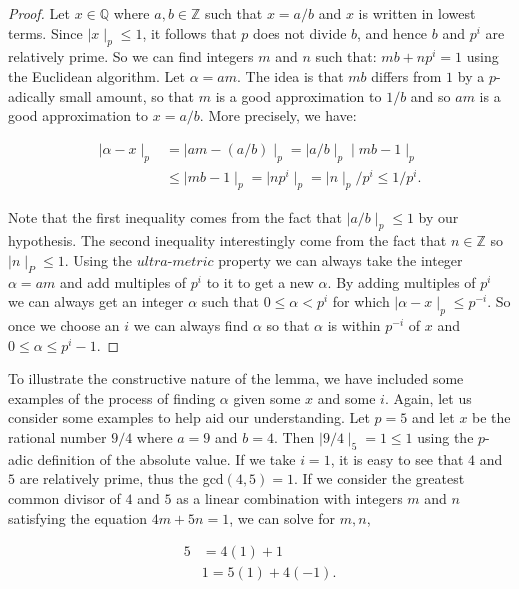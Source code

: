 \documentclass[12pt]{amsart}
\theoremstyle{plain}
\theoremstyle{definition}
\begin{document}
\begin{proof}

Let $x \in \mathbb{Q}$ where $a, b \in \mathbb{Z}$ such that $x = a/b$ and $x$ is written in lowest terms. Since $\mid x \mid_p \le 1$, it follows that $p$ does not divide $b$, and hence $b$ and $p^i$ are relatively prime. So we can find integers $m$ and $n$ such that: $mb + np^i = 1$ using the Euclidean algorithm.  Let $\alpha = am$. The idea is that $mb$ differs from $1$ by a $p$-adically small amount, so that $m$ is a good approximation to $1/b$ and so $am$ is a good approximation to $x = a/b$. More precisely, we have:


\begin{align}
\mid \alpha - x \mid_p & = \mid am - (a/b) \mid_p = \mid a/b \mid_p \mid mb - 1\mid_p \nonumber\\
&\le \mid mb - 1 \mid_p = \mid np^i \mid_p = \mid n \mid_p/p^i \le 1/p^i.\nonumber
\end{align}

Note that the first inequality comes from the fact that $\mid a/b \mid_p \le 1$ by our hypothesis. The second inequality interestingly come from the fact that $n \in \mathbb{Z}$ so $\mid n \mid_P \le 1$.
Using the $ultra$-$metric$ property we can always take the integer $\alpha = am$ and add multiples of $p^i$ to it to get a new $\alpha$.  By adding multiples of $p^i$ we can always get an integer $\alpha$ such that  $0 \le \alpha < p^i$ for which $\mid \alpha - x \mid_p \le p^{-i}$. So once we choose an $i$ we can always find $\alpha$ so that $\alpha$ is within $p^{-i}$ of $x$ and $0 \le \alpha \le p^i - 1$.
\end{proof}

To illustrate the constructive nature of the lemma, we have included some examples of the process of finding $\alpha$ given some $x$ and some $i$.
Again, let us consider some examples to help aid our understanding. 
Let  $p = 5$ and let $x$ be the rational number $9/4$ where $a = 9 $ and $b = 4$.  Then  $\mid 9/4 \mid_5 = 1 \le 1$ using the $p$-adic definition of the absolute value. If we take $i = 1$, it is easy to see that $4$ and $5$ are relatively prime, thus the  gcd$(4, 5) = 1$. If we consider the greatest common divisor of $4$ and $5$ as a linear combination with integers $m$ and $n$ satisfying the equation $4m + 5n = 1$, we can solve for $m,n$,

\begin{align}
5 & = 4(1) + 1 \nonumber \\
&1 = 5(1) + 4(-1).\nonumber
\end{align}
\end{document}
